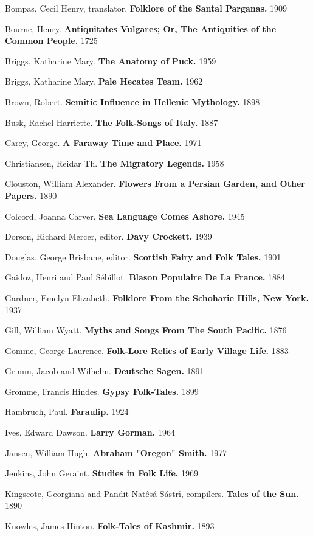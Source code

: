 \documentclass[14pt,a4paper]{memoir}
\begin{document}
{{Bompas, Cecil Henry, translator. \textbf{Folklore of the Santal
Parganas.} 1909

Bourne, Henry. \textbf{Antiquitates Vulgares; Or, The Antiquities of the
Common People.} 1725

Briggs, Katharine Mary. \textbf{The Anatomy of Puck.} 1959

Briggs, Katharine Mary. \textbf{Pale Hecate\textquotesingle s Team.}
1962

Brown, Robert. \textbf{Semitic Influence in Hellenic Mythology.} 1898

Busk, Rachel Harriette. \textbf{The Folk-Songs of Italy.} 1887

Carey, George. \textbf{A Faraway Time and Place.} 1971

Christiansen, Reidar Th. \textbf{The Migratory Legends.} 1958

Clouston, William Alexander. \textbf{Flowers From a Persian Garden, and
Other Papers.} 1890

Colcord, Joanna Carver. \textbf{Sea Language Comes Ashore.} 1945

Dorson, Richard Mercer, editor. \textbf{Davy Crockett.} 1939

Douglas, George Brisbane, editor. \textbf{Scottish Fairy and Folk
Tales.} 1901

Gaidoz, Henri and Paul Sébillot. \textbf{Blason Populaire De La France.}
1884

Gardner, Emelyn Elizabeth. \textbf{Folklore From the Schoharie Hills,
New York.} 1937

Gill, William Wyatt. \textbf{Myths and Songs From The South Pacific.}
1876

Gomme, George Laurence. \textbf{Folk-Lore Relics of Early Village Life.}
1883

Grimm, Jacob and Wilhelm. \textbf{Deutsche Sagen.} 1891

Gromme, Francis Hindes. \textbf{Gypsy Folk-Tales.} 1899

Hambruch, Paul. \textbf{Faraulip.} 1924

Ives, Edward Dawson. \textbf{Larry Gorman.} 1964

Jansen, William Hugh. \textbf{Abraham "Oregon" Smith.} 1977

Jenkins, John Geraint. \textbf{Studies in Folk Life.} 1969

Kingscote, Georgiana and Pandit Natêsá Sástrî, compilers. \textbf{Tales
of the Sun.} 1890

Knowles, James Hinton. \textbf{Folk-Tales of Kashmir.} 1893

}}
\end{document}
